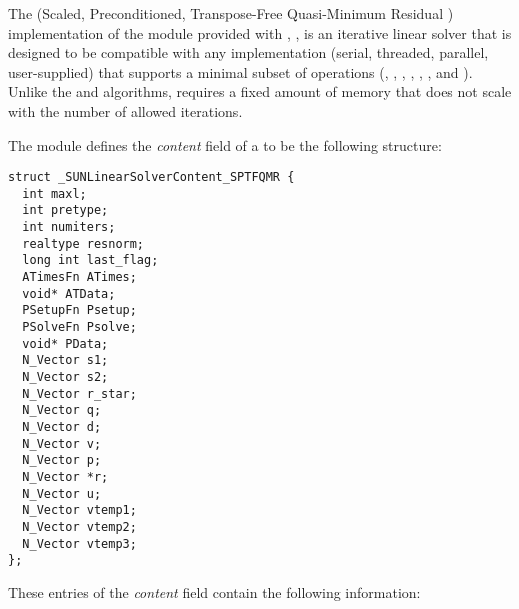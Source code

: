 
The {\sptfqmr} (Scaled, Preconditioned, Transpose-Free Quasi-Minimum
Residual \cite{Fre:93}) implementation of the {\sunlinsol} module 
provided with {\sundials}, {\sunlinsolsptfqmr}, is an iterative linear
solver that is designed to be compatible with any {\nvector}
implementation (serial, threaded, parallel, user-supplied) that
supports a minimal subset of operations (, 
, , , ,
,  and ).  Unlike the
{\spgmr} and {\spfgmr} algorithms, {\spbcg} requires a fixed amount of
memory that does not scale with the number of allowed iterations.

The {\sunlinsolsptfqmr} module defines the {\em content} field of a
 to be the following structure:
\begin{verbatim} 
struct _SUNLinearSolverContent_SPTFQMR {
  int maxl;
  int pretype;
  int numiters;
  realtype resnorm;
  long int last_flag;
  ATimesFn ATimes;
  void* ATData;
  PSetupFn Psetup;
  PSolveFn Psolve;
  void* PData;
  N_Vector s1;
  N_Vector s2;
  N_Vector r_star;
  N_Vector q;
  N_Vector d;
  N_Vector v;
  N_Vector p;
  N_Vector *r;
  N_Vector u;
  N_Vector vtemp1;
  N_Vector vtemp2;
  N_Vector vtemp3;
};
\end{verbatim}
These entries of the \emph{content} field contain the following
information:
